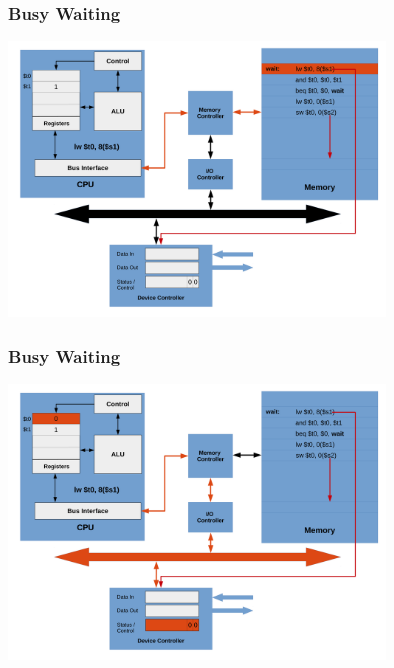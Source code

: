 \documentclass{beamer}
\begin{document}
\begin{frame}%
\frametitle{Busy Waiting}

\vspace*{-0.2cm}
\begin{center}
\hspace*{-1cm}\includegraphics[width=10cm]{busy_waiting3.pdf}
\end{center}

\end{frame}

\begin{frame}%
\frametitle{Busy Waiting}

\vspace*{-0.2cm}
\begin{center}
\hspace*{-1cm}\includegraphics[width=10cm]{busy_waiting4.pdf}
\end{center}

\end{frame}
\end{document}
